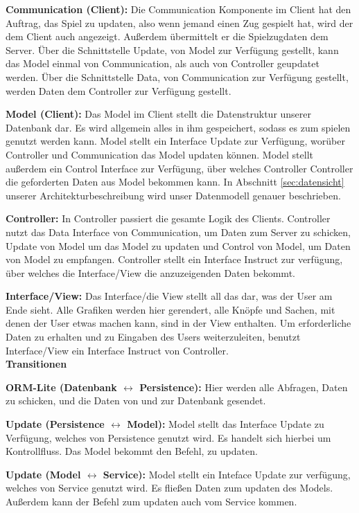 \documentclass[fontsize=12pt,paper=a4,twoside]{scrartcl}
\begin{document}
\textbf{Communication (Client):}
Die Communication Komponente im Client hat den Auftrag, das Spiel zu updaten, also wenn jemand einen Zug gespielt hat, wird der dem Client auch angezeigt. Außerdem übermittelt er die Spielzugdaten dem Server. Über die Schnittstelle Update, von Model zur Verfügung gestellt, kann das Model einmal von Communication, als auch von Controller geupdatet werden. Über die Schnittstelle Data, von Communication zur Verfügung gestellt, werden Daten dem Controller zur Verfügung gestellt.

\textbf{Model (Client):}
Das Model im Client stellt die Datenstruktur unserer Datenbank dar. Es wird allgemein alles in ihm gespeichert, sodass es zum spielen genutzt werden kann. Model stellt ein Interface Update zur Verfügung, worüber Controller und Communication das Model updaten können. Model stellt außerdem ein Control Interface zur Verfügung, über welches Controller Controller die geforderten Daten aus Model bekommen kann. In Abschnitt \ref{sec:datensicht} unserer Architekturbeschreibung wird unser Datenmodell genauer beschrieben.

\textbf{Controller:}
In Controller passiert die gesamte Logik des Clients. Controller nutzt das Data Interface von Communication, um Daten zum Server zu schicken, Update von Model um das Model zu updaten und Control von Model, um Daten von Model zu empfangen. Controller stellt ein Interface Instruct zur verfügung, über welches die Interface/View die anzuzeigenden Daten bekommt. 

\textbf{Interface/View:}
Das Interface/die View stellt all das dar, was der User am Ende sieht. Alle Grafiken werden hier gerendert, alle Knöpfe und Sachen, mit denen der User etwas machen kann, sind in der View enthalten. Um erforderliche Daten zu erhalten und zu Eingaben des Users weiterzuleiten, benutzt Interface/View ein Interface Instruct von Controller. \\

\textbf{Transitionen}

\textbf{ORM-Lite (Datenbank $\leftrightarrow$ Persistence):}
Hier werden alle Abfragen, Daten zu schicken, und die Daten von und zur Datenbank gesendet.

\textbf{Update (Persistence $\leftrightarrow$ Model):}
Model stellt das Interface Update zu Verfügung, welches von Persistence genutzt wird. Es handelt sich hierbei um Kontrollfluss. Das Model bekommt den Befehl, zu updaten. 

\textbf{Update (Model $\leftrightarrow$ Service):}
Model stellt ein Inteface Update zur verfügung, welches von Service genutzt wird. Es fließen Daten zum updaten des Models. Außerdem kann der Befehl zum updaten auch vom Service kommen.
\end{document}

